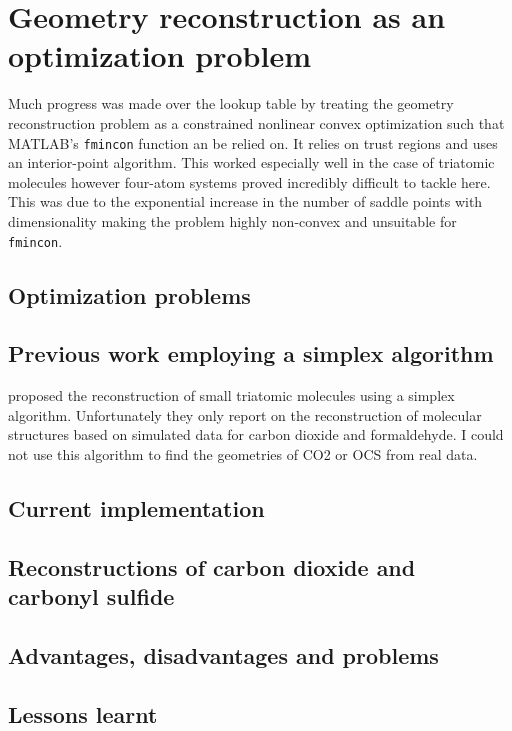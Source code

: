 \chapter{Geometry reconstruction as an optimization problem}\label{ch:optimization}

Much progress was made over the lookup table by treating the geometry reconstruction problem as a constrained nonlinear convex optimization such that MATLAB's \texttt{fmincon} function an be relied on. It relies on trust regions and uses an interior-point algorithm. This worked especially well in the case of triatomic molecules however four-atom systems proved incredibly difficult to tackle here. This was due to the exponential increase in the number of saddle points with dimensionality \footnotemark making the problem highly non-convex and unsuitable for \texttt{fmincon}.


\section{Optimization problems}
\section{Previous work employing a simplex algorithm}
\citet{Brichta09} proposed the reconstruction of small triatomic molecules using a simplex algorithm. Unfortunately they only report on the reconstruction of molecular structures based on simulated data for carbon dioxide and formaldehyde. I could not use this algorithm to find the geometries of CO2 or OCS from real data.

\section{Current implementation}

\section{Reconstructions of carbon dioxide and carbonyl sulfide}

\section{Advantages, disadvantages and problems}

\section{Lessons learnt}
